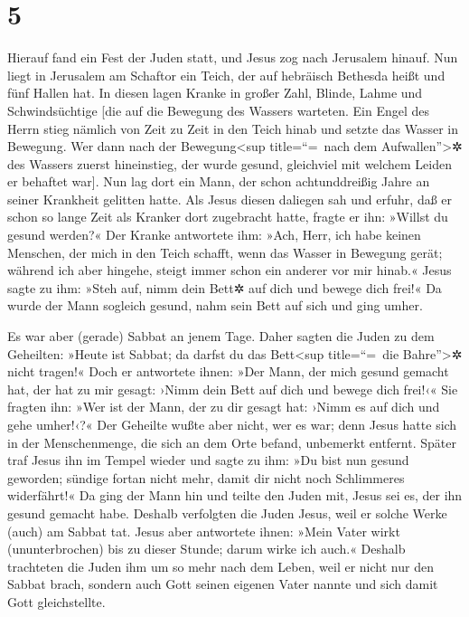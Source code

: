 \hypertarget{section-4}{%
\section{5}\label{section-4}}

 Hierauf fand ein Fest der Juden statt, und Jesus zog nach
Jerusalem hinauf.  Nun liegt in Jerusalem am Schaftor ein
Teich, der auf hebräisch Bethesda heißt und fünf Hallen hat.
 In diesen lagen Kranke in großer Zahl, Blinde, Lahme und
Schwindsüchtige {[}die auf die Bewegung des Wassers warteten.
 Ein Engel des Herrn stieg nämlich von Zeit zu Zeit in den
Teich hinab und setzte das Wasser in Bewegung. Wer dann nach der
Bewegung\textless sup title=``=~nach dem Aufwallen''\textgreater✲ des
Wassers zuerst hineinstieg, der wurde gesund, gleichviel mit welchem
Leiden er behaftet war{]}.  Nun lag dort ein Mann, der
schon achtunddreißig Jahre an seiner Krankheit gelitten hatte.
 Als Jesus diesen daliegen sah und erfuhr, daß er schon so
lange Zeit als Kranker dort zugebracht hatte, fragte er ihn: »Willst du
gesund werden?«  Der Kranke antwortete ihm: »Ach, Herr,
ich habe keinen Menschen, der mich in den Teich schafft, wenn das Wasser
in Bewegung gerät; während ich aber hingehe, steigt immer schon ein
anderer vor mir hinab.«  Jesus sagte zu ihm: »Steh auf,
nimm dein Bett✲ auf dich und bewege dich frei!«  Da wurde
der Mann sogleich gesund, nahm sein Bett auf sich und ging umher.

Es war aber (gerade) Sabbat an jenem Tage.  Daher sagten
die Juden zu dem Geheilten: »Heute ist Sabbat; da darfst du das
Bett\textless sup title=``=~die Bahre''\textgreater✲ nicht tragen!«
 Doch er antwortete ihnen: »Der Mann, der mich gesund
gemacht hat, der hat zu mir gesagt: ›Nimm dein Bett auf dich und bewege
dich frei!‹«  Sie fragten ihn: »Wer ist der Mann, der zu
dir gesagt hat: ›Nimm es auf dich und gehe umher!‹?«  Der
Geheilte wußte aber nicht, wer es war; denn Jesus hatte sich in der
Menschenmenge, die sich an dem Orte befand, unbemerkt entfernt.
 Später traf Jesus ihn im Tempel wieder und sagte zu ihm:
»Du bist nun gesund geworden; sündige fortan nicht mehr, damit dir nicht
noch Schlimmeres widerfährt!«  Da ging der Mann hin und
teilte den Juden mit, Jesus sei es, der ihn gesund gemacht habe.
 Deshalb verfolgten die Juden Jesus, weil er solche Werke
(auch) am Sabbat tat.  Jesus aber antwortete ihnen: »Mein
Vater wirkt (ununterbrochen) bis zu dieser Stunde; darum wirke ich
auch.«  Deshalb trachteten die Juden ihm um so mehr nach
dem Leben, weil er nicht nur den Sabbat brach, sondern auch Gott seinen
eigenen Vater nannte und sich damit Gott gleichstellte.

